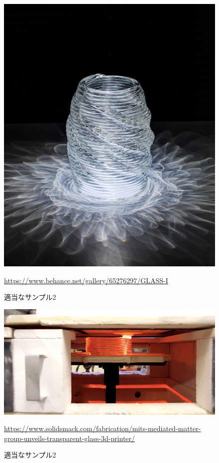\begin{figure}[H]
  \centering
  \includegraphics[width=8truecm]{./fig/Additive1.jpg}
  \caption{適当なサンプル2}
  \url{https://www.behance.net/gallery/65276297/GLASS-I} %
  \label{fig:ferret}
\end{figure}

\begin{figure}[H]
  \centering
  \includegraphics[width=13truecm]{./fig/Additive3.jpg}
  \caption{適当なサンプル2}
  \url{https://www.solidsmack.com/fabrication/mits-mediated-matter-group-unveils-transparent-glass-3d-printer/} %
  \label{fig:ferret}
\end{figure}



